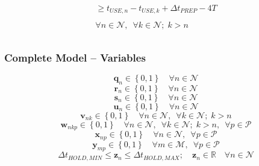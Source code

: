 \documentclass{beamer}
\begin{document}
\begin{frame}
\begin{itemize}
\begin{equation}
\begin{split}
\begin{aligned}
                    \ge t_{\mathit{USE},n} - t_{\mathit{USE},k}
                    + \Delta t_{\mathit{PREP}} - 4T
                \end{aligned}\\
                \begin{aligned}
                    \forall n \in \mathcal{N}, \enspace \forall k 
                    \in \mathcal{N}; \; k > n
                \end{aligned}\\
            \end{split}
        \end{equation}
    \end{itemize}
\end{frame}

\begin{frame}
    \frametitle{Complete Model -- Variables}
    \begin{equation}
        \boldsymbol{q}_{n} \in \left\{0, 1\right\} \quad \forall n \in 
        \mathcal{N}
    \end{equation}
    \begin{equation}
        \boldsymbol{r}_{n} \in \left\{ 0, 1 \right\} \quad \forall n \in 
        \mathcal{N}
    \end{equation}
    \begin{equation}
        \boldsymbol{s}_{n} \in \left\{ 0, 1 \right\} \quad \forall n \in 
        \mathcal{N}
    \end{equation} 
    \begin{equation}
        \boldsymbol{u}_{n} \in \left\{ 0, 1 \right\} \quad \forall n \in 
        \mathcal{N}
    \end{equation}
    \begin{equation}
        \boldsymbol{v}_{nk} \in \left\{ 0, 1 \right\} \quad \forall n \in 
        \mathcal{N}, \enspace \forall k \in \mathcal{N}; \; k > n
    \end{equation}
    \begin{equation}
        \boldsymbol{w}_{nkp} \in \left\{ 0, 1 \right\} \quad \forall n \in 
        \mathcal{N}, \enspace \forall k \in \mathcal{N}; \; k > n, \enspace
        \forall p \in \mathcal{P}
    \end{equation}
    \begin{equation}
        \boldsymbol{x}_{np} \in \left\{ 0, 1 \right\} \quad \forall n \in 
        \mathcal{N}, \enspace \forall p \in \mathcal{P}
    \end{equation}
    \begin{equation}
        \boldsymbol{y}_{mp} \in \left\{ 0, 1 \right\} \quad \forall m \in 
        \mathcal{M}, \enspace \forall p \in \mathcal{P}
    \end{equation}
    \begin{equation}
        \Delta t_{\mathit{HOLD,MIN}} \le \boldsymbol{z}_{n} \le 
        \Delta t_{\mathit{HOLD,MAX}}; \quad
        \boldsymbol{z}_{n} \in \mathbb{R} \quad \forall n \in \mathcal{N}
    \end{equation}
\end{frame}
\end{document}
